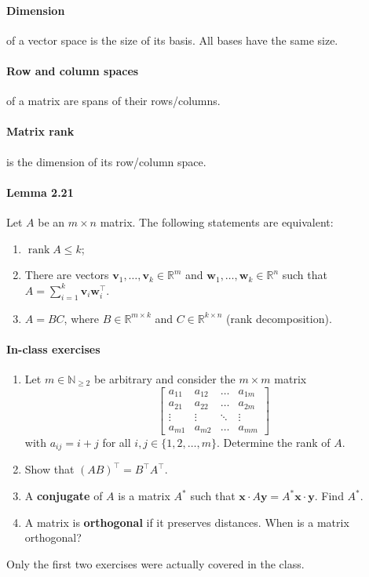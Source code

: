 \documentclass{article}
\begin{document}
\paragraph{Dimension} of a vector space is the size of its basis. All bases have the same size.

\paragraph{Row and column spaces} of a matrix are spans of their rows/columns.

\paragraph{Matrix rank} is the dimension of its row/column space.

\paragraph{Lemma 2.21} Let $A$ be an $m \times n$ matrix. The following statements are equivalent:
\begin{enumerate}
    \item $\operatorname{rank} A \leq k$;
    \item There are vectors $\mathbf{v}_1,\dots,\mathbf{v}_k \in \mathbb R^m$ and $\mathbf{w}_1,\dots,\mathbf{w}_k \in \mathbb R^n$ such that $A = \sum\limits_{i=1}^k \mathbf{v}_i \mathbf{w}_i^\top$.
    \item $A = BC$, where $B \in \mathbb R^{m \times k}$ and $C \in \mathbb R^{k \times n}$ (rank decomposition).
\end{enumerate}

\paragraph{In-class exercises}

\begin{enumerate}
    \item Let $m \in \mathbb N_{\geq 2}$ be arbitrary and consider the $m \times m$ matrix
    $$
    \begin{bmatrix}
        a_{11} & a_{12} & \dots & a_{1m} \\
        a_{21} & a_{22} & \dots & a_{2m} \\
        \vdots & \vdots & \ddots & \vdots \\
        a_{m1} & a_{m2} & \dots & a_{mm}
    \end{bmatrix}
    $$
    with $a_{ij} = i + j$ for all $i,j \in \{1,2,\dots,m\}$. Determine the rank of $A$.
    \item Show that $(AB)^\top = B^\top A^\top$.
    \item A \textbf{conjugate} of $A$ is a matrix $A^*$ such that $\mathbf x \cdot A\mathbf y = A^* \mathbf x \cdot \mathbf y$. Find $A^*$.
    \item A matrix is \textbf{orthogonal} if it preserves distances. When is a matrix orthogonal?
\end{enumerate}

Only the first two exercises were actually covered in the class.
\end{document}
